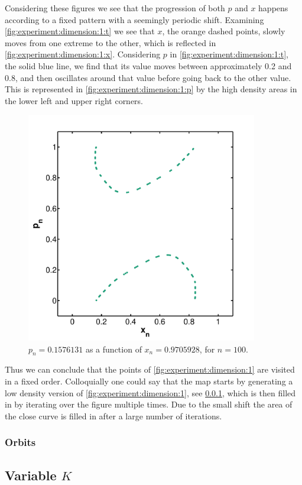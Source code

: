 	Considering these figures we see that the progression of both $p$ and $x$ happens according to a fixed pattern with a seemingly periodic shift. Examining \cref{fig:experiment:dimension:1:t} we see that $x$, the orange dashed points, slowly moves from one extreme to the other, which is reflected in \cref{fig:experiment:dimension:1:x}. Considering $p$ in \cref{fig:experiment:dimension:1:t}, the solid blue line, we find that its value moves between approximately 0.2 and 0.8, and then oscillates around that value before going back to the other value. This is represented in \cref{fig:experiment:dimension:1:p} by the high density areas in the lower left and upper right corners.

	\begin{figure}
		\centering
		\includegraphics[width=0.9\textwidth]{./img/assignment_a_1_dim_n100}
		\caption{$p_n = \num{0.1576131}$ as a function of $x_n= \num{0.9705928}$, for $n = 100$.}
		\label{fig:experiment:a_1_n100}
	\end{figure}

	Thus we can conclude that the points of \cref{fig:experiment:dimension:1} are visited in a fixed order. Colloquially one could say that the map starts by generating a low density version of \cref{fig:experiment:dimension:1}, see \cref{}, which is then filled in by iterating over the figure multiple times. Due to the small shift the area of the close curve is filled in after a large number of iterations.

	\subsubsection{Orbits}	

	

\subsection[]{Variable $K$}
\label{ss:variable}